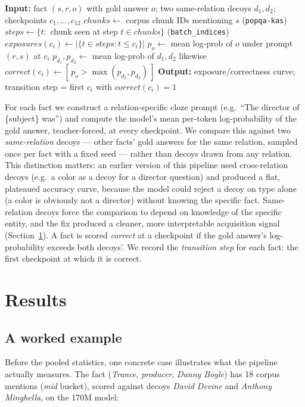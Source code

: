 \documentclass[11pt]{article}
\begin{document}
\begin{algorithm}[t]
\caption{Per-fact exposure-vs-confidence pipeline}
\label{alg:pipeline}
\begin{algorithmic}[1]
\State \textbf{Input:} fact $(s,r,o)$ with gold answer $o$; two same-relation decoys $d_1,d_2$; checkpoints $c_1,\dots,c_{12}$
\State $\mathit{chunks} \gets$ corpus chunk IDs mentioning $s$ (\texttt{popqa-kas})
\State $\mathit{steps} \gets \{t : $ chunk seen at step $t \in \mathit{chunks}\}$ (\texttt{batch\_indices})
  \State $\mathit{exposures}(c_i) \gets |\{t \in \mathit{steps} : t \le c_i\}|$
  \State $p_o \gets$ mean log-prob of $o$ under prompt$(r,s)$ at $c_i$
  \State $p_{d_1}, p_{d_2} \gets$ mean log-prob of $d_1, d_2$ likewise
  \State $\mathit{correct}(c_i) \gets [\,p_o > \max(p_{d_1}, p_{d_2})\,]$
\EndFor
\State \textbf{Output:} exposure/correctness curve; transition step = first $c_i$ with $\mathit{correct}(c_i)=1$
\end{algorithmic}
\end{algorithm}

For each fact we construct a relation-specific cloze prompt (e.g.\ ``The director of \{subject\} was'') and compute the model's mean per-token log-probability of the gold answer, teacher-forced, at every checkpoint. We compare this against two \emph{same-relation} decoys --- other facts' gold answers for the same relation, sampled once per fact with a fixed seed --- rather than decoys drawn from any relation. This distinction matters: an earlier version of this pipeline used cross-relation decoys (e.g.\ a color as a decoy for a director question) and produced a flat, plateaued accuracy curve, because the model could reject a decoy on type alone (a color is obviously not a director) without knowing the specific fact. Same-relation decoys force the comparison to depend on knowledge of the specific entity, and the fix produced a cleaner, more interpretable acquisition signal (Section~\ref{sec:results}). A fact is scored \emph{correct} at a checkpoint if the gold answer's log-probability exceeds both decoys'. We record the \emph{transition step} for each fact: the first checkpoint at which it is correct.

\section{Results}
\label{sec:results}

\subsection{A worked example}
Before the pooled statistics, one concrete case illustrates what the pipeline actually measures. The fact (\textit{Trance}, \textit{producer}, \textit{Danny Boyle}) has 18 corpus mentions (\textit{mid} bucket), scored against decoys \textit{David Devine} and \textit{Anthony Minghella}, on the 170M model:
\end{document}
